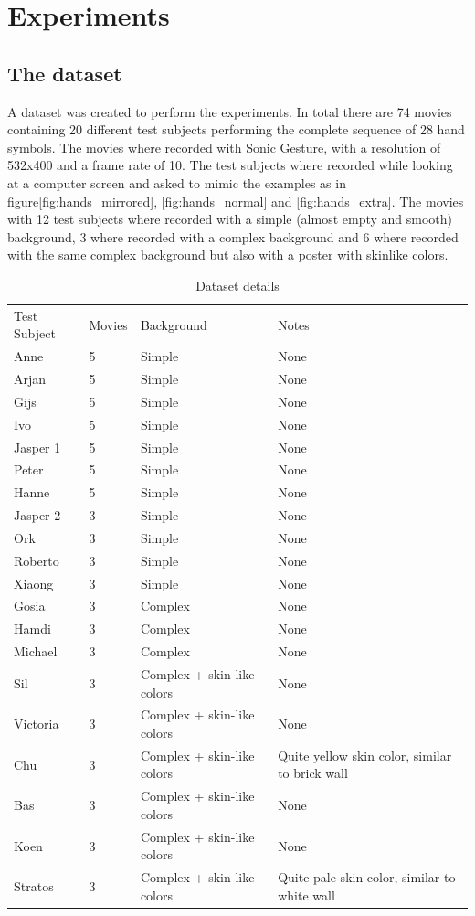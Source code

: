 \chapter{Experiments}
\label{ch:experiments}


\section{The dataset}
A dataset was created to perform the experiments. In total there are 74 movies containing 20 different test subjects performing the complete sequence of 28 hand symbols. The movies where recorded with Sonic Gesture, with a resolution of 532x400 and a frame rate of 10. The test subjects where recorded while looking at a computer screen and asked to mimic the examples as in figure\ref{fig:hands_mirrored}, \ref{fig:hands_normal} and \ref{fig:hands_extra}. The movies with 12 test subjects where recorded with a simple (almost empty and smooth) background, 3 where recorded with a complex background and 6 where recorded with the same complex background but also with a poster with skinlike colors.

\begin{table}
\begin{tabular}{llll}
	Test Subject & Movies & Background & Notes \\
	Anne     & 5 & Simple & None \\
	Arjan    & 5 & Simple & None \\
	Gijs     & 5 & Simple & None \\
	Ivo      & 5 & Simple & None \\
	Jasper 1 & 5 & Simple & None \\
	Peter    & 5 & Simple & None \\
	Hanne    & 5 & Simple & None \\
	Jasper 2 & 3 & Simple & None \\
	Ork      & 3 & Simple & None \\
	Roberto  & 3 & Simple & None \\
	Xiaong   & 3 & Simple & None \\
	\hline			
	Gosia    & 3 & Complex & None \\
	Hamdi    & 3 & Complex & None \\
	Michael  & 3 & Complex & None \\
	Sil      & 3 & Complex + skin-like colors & None \\
	Victoria & 3 & Complex + skin-like colors & None \\
	Chu      & 3 & Complex + skin-like colors & Quite yellow skin color, similar to brick wall \\
	\hline	
	Bas      & 3 & Complex + skin-like colors & None \\
	Koen     & 3 & Complex + skin-like colors & None \\
	Stratos  & 3 & Complex + skin-like colors & Quite pale skin color, similar to white wall \\
\end{tabular}
\caption{Dataset details}
\end{table}

